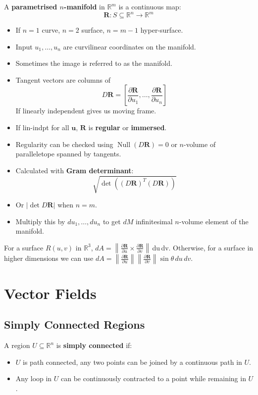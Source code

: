 \documentclass[a4paper]{article}
\newcommand{\RR}{\mathbb{R}}
\def\pp#1#2{\frac{\partial #1}{\partial #2}}
\newenvironment{definition}[1][Definition.]{\begin{trivlist}
\item[\hskip \labelsep {\bfseries #1}]}{\end{trivlist}}
\begin{document}
\begin{multicols}{2}
	\begin{definition}A \textbf{parametrised $n$-manifold} in $\RR^m$ is a continuous map:
		$$\mathbf{R}:S\subseteq\RR^n\to\RR^m$$
		\begin{itemize}
			\item  If $n=1$ curve, $n=2$ surface, $n=m-1$ hyper-surface.
			\item Input $u_1,\dots,u_n$ are curvilinear  coordinates on the manifold.
			\item Sometimes the image is referred to as the manifold.
			\item Tangent vectors are columns of $$D\mathbf{R}=\left[ \pp{\mathbf{R}}{u_1},\dots,\pp{\mathbf{R}}{u_n} \right]$$
			      If linearly independent gives us moving frame.
			\item If lin-indpt for all $\mathbf{u}$, $\mathbf{R}$ is \textbf{regular} or \textbf{immersed}.
			\item Regularity can be checked using $\operatorname{Null}(D\mathbf{R})=0$ or $n$-volume of paralleletope spanned by tangents.
			\item Calculated with \textbf{Gram determinant}:
			      $$\sqrt{\det ((D\mathbf{R})^T(D\mathbf{R}))}$$
			\item Or $|\det{D\mathbf{R}}|$ when $n=m$.
			\item Multiply this by $du_1,\dots,du_n$ to get $dM$ infinitesimal $n$-volume element of the manifold.
		\end{itemize}

	\end{definition}
	For a surface $R(u,v)$ in $\RR^3$, $dA=\left\|\pp{\mathbf{R}}{u}\times \pp{\mathbf{R}}{v}\right\|$\,du\,dv.
	Otherwise, for a surface in higher dimensions we can use $dA=\left\|\pp{\mathbf{R}}{u}\right\|\left\|\pp{\mathbf{R}}{v}\right\|\sin\theta\,du\,dv$.


	\section*{Vector Fields}

	\subsection*{Simply Connected Regions}
	A region $U\subseteq \RR^n$ is \textbf{simply connected} if:
	\begin{itemize}
		\item $U$ is path connected, any two points can be joined by a continuous path in $U$.
		\item Any loop in $U$ can be continuously contracted to a point while remaining in $U$.
	\end{itemize}




\end{multicols}
\end{document}
